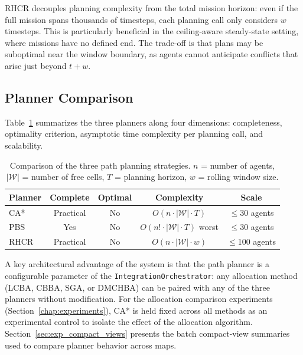 RHCR decouples planning complexity from the total mission horizon: even if the
full mission spans thousands of timesteps, each planning call only considers
$w$ timesteps.
This is particularly beneficial in the ceiling-aware steady-state setting,
where missions have no defined end.
The trade-off is that plans may be suboptimal near the window boundary, as
agents cannot anticipate conflicts that arise just beyond $t + w$.


\subsection{Planner Comparison}
\label{subsec:method_planner_comparison}

Table~\ref{tab:planner_comparison} summarizes the three planners along four
dimensions: completeness, optimality criterion, asymptotic time complexity per
planning call, and scalability.

\begin{table}[htbp]
  \centering
  \caption{Comparison of the three path planning strategies.
           $n$ = number of agents, $|\mathcal{W}|$ = number of free cells,
           $T$ = planning horizon, $w$ = rolling window size.}
  \label{tab:planner_comparison}
  \small
  \begin{tabular}{lcccc}
    \toprule
    \textbf{Planner} & \textbf{Complete} & \textbf{Optimal} &
    \textbf{Complexity} & \textbf{Scale} \\
    \midrule
    CA*   & Practical & No & $O(n \cdot |\mathcal{W}| \cdot T)$ & $\leq$30 agents \\
    PBS   & Yes       & No & $O(n! \cdot |\mathcal{W}| \cdot T)$ worst & $\leq$30 agents \\
    RHCR  & Practical & No & $O(n \cdot |\mathcal{W}| \cdot w)$ & $\leq$100 agents \\
    \bottomrule
  \end{tabular}
\end{table}

A key architectural advantage of the system is that the path planner is a
configurable parameter of the \texttt{IntegrationOrchestrator}: any allocation
method (LCBA, CBBA, SGA, or DMCHBA) can be paired with any of the three
planners without modification.
  For the allocation comparison experiments (Section~\ref{chap:experiments}),
  CA* is held fixed across all methods as an
experimental control to isolate the effect of the allocation algorithm.
Section~\ref{sec:exp_compact_views} presents the batch compact-view summaries
used to compare planner behavior across maps.


